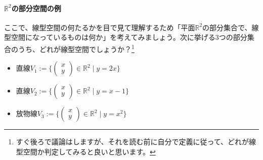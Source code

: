 \paragraph{$\mathbb{R}^2$の部分空間の例} ここで、線型空間の何たるかを目で見て理解するため「平面$\mathbb{R}^2$の部分集合で、線型空間になっているものは何か」を考えてみましょう。次に挙げる$3$つの部分集合のうち、どれが線型空間でしょうか？\footnote{すぐ後ろで議論はしますが、それを読む前に自分で定義に従って、どれが線型空間か判定してみると良いと思います。}
\begin{itemize}
\item 直線$\displaystyle V_1 := \biggl\{ \begin{pmatrix} x \\ y \end{pmatrix} \in \mathbb{R}^2 \mid y = 2x \biggr\}$
\item 直線$\displaystyle V_2 := \biggl\{ \begin{pmatrix} x \\ y \end{pmatrix} \in \mathbb{R}^2 \mid y = x - 1 \biggr\}$
\item 放物線$\displaystyle V_3 := \biggl\{ \begin{pmatrix} x \\ y \end{pmatrix} \in \mathbb{R}^2 \mid y = x^2 \biggr\}$
\end{itemize}
